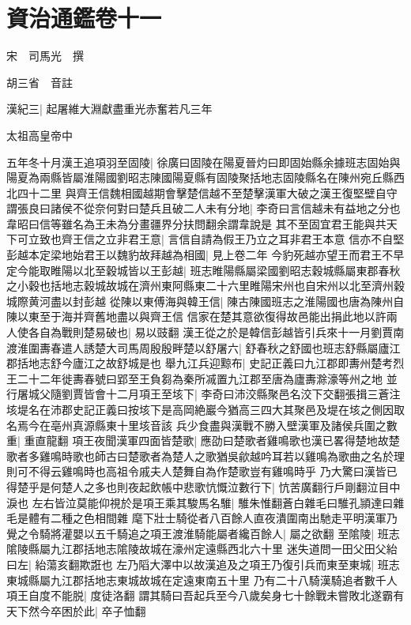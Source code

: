 \chapter{資治通鑑卷十一}
宋　司馬光　撰

胡三省　音註

漢紀三|{
	起屠維大淵獻盡重光赤奮若凡三年}


太祖高皇帝中

五年冬十月漢王追項羽至固陵|{
	徐廣曰固陵在陽夏晉灼曰即固始縣余據班志固始與陽夏為兩縣皆屬淮陽國劉昭志陳國陽夏縣有固陵聚括地志固陵縣名在陳州宛丘縣西北四十二里}
與齊王信魏相國越期會擊楚信越不至楚擊漢軍大破之漢王復堅壁自守謂張良曰諸侯不從奈何對曰楚兵且破二人未有分地|{
	李奇曰言信越未有益地之分也韋昭曰信等雖名為王未為分畫疆界分扶問翻余謂韋說是}
其不至固宜君王能與共天下可立致也齊王信之立非君王意|{
	言信自請為假王乃立之耳非君王本意}
信亦不自堅彭越本定梁地始君王以魏豹故拜越為相國|{
	見上卷二年}
今豹死越亦望王而君王不早定今能取睢陽以北至穀城皆以王彭越|{
	班志睢陽縣屬梁國劉昭志穀城縣屬東郡春秋之小穀也括地志穀城故城在濟州東阿縣東二十六里睢陽宋州也自宋州以北至濟州穀城際黄河盡以封彭越}
從陳以東傅海與韓王信|{
	陳古陳國班志之淮陽國也唐為陳州自陳以東至于海并齊舊地盡以與齊王信}
信家在楚其意欲復得故邑能出捐此地以許兩人使各自為戰則楚易破也|{
	易以豉翻}
漢王從之於是韓信彭越皆引兵來十一月劉賈南渡淮圍夀春遣人誘楚大司馬周殷殷畔楚以舒屠六|{
	舒春秋之舒國也班志舒縣屬廬江郡括地志舒今廬江之故舒城是也}
舉九江兵迎黥布|{
	史記正義曰九江郡即夀州楚考烈王二十二年徙夀春號曰郢至王負芻為秦所㓕置九江郡至唐為廬夀滁濠等州之地}
並行屠城父隨劉賈皆會十二月項王至垓下|{
	李奇曰沛洨縣聚邑名洨下交翻張揖三蒼注垓堤名在沛郡史記正義曰按垓下是高岡絶巖今猶高三四大其聚邑及堤在垓之側因取名焉今在亳州真源縣東十里垓音該}
兵少食盡與漢戰不勝入壁漢軍及諸侯兵圍之數重|{
	重直龍翻}
項王夜聞漢軍四面皆楚歌|{
	應劭曰楚歌者雞鳴歌也漢已畧得楚地故楚歌者多雞鳴時歌也師古曰楚歌者為楚人之歌猶吳歈越吟耳若以雞鳴為歌曲之名於理則可不得云雞鳴時也高祖令戚夫人楚舞自為作楚歌豈有雞鳴時乎}
乃大驚曰漢皆已得楚乎是何楚人之多也則夜起飲帳中悲歌忼慨泣數行下|{
	忼苦廣翻行戶剛翻泣目中淚也}
左右皆泣莫能仰視於是項王乘其駿馬名騅|{
	騅朱惟翻蒼白雜毛曰騅孔頴達曰雜毛是體有二種之色相間雜}
麾下壯士騎從者八百餘人直夜潰圍南出馳走平明漢軍乃覺之令騎將灌嬰以五千騎追之項王渡淮騎能屬者纔百餘人|{
	屬之欲翻}
至隂陵|{
	班志隂陵縣屬九江郡括地志隂陵故城在濠州定遠縣西北六十里}
迷失道問一田父田父紿曰左|{
	紿蕩亥翻欺誑也}
左乃䧟大澤中以故漢追及之項王乃復引兵而東至東城|{
	班志東城縣屬九江郡括地志東城故城在定遠東南五十里}
乃有二十八騎漢騎追者數千人項王自度不能脱|{
	度徒洛翻}
謂其騎曰吾起兵至今八歲矣身七十餘戰未嘗敗北遂霸有天下然今卒困於此|{
	卒子恤翻}
